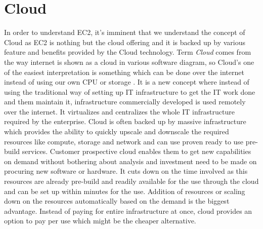 \section{Cloud}
In order to understand EC2, it's imminent that we understand the concept of Cloud as EC2 is nothing but the cloud offering and it is backed up by various feature and benefits provided by the Cloud technology.  Term \emph{Cloud} comes from the way internet is shown as a cloud in various software diagram, so Cloud's one of the easiest interpretation is something which can be done over the internet instead of using our own CPU or storage \cite{www-infoworld}. It is a new concept where instead of using the traditional way of setting up IT infrastructure to get the IT work done and them maintain it, infrastructure commercially developed is used remotely over the internet. It virtualizes and centralizes the whole IT infrastructure required by the enterprise. Cloud is often backed up by massive infrastructure which provides the ability to quickly upscale and downscale the required resources like compute, storage and network and can use proven ready to use pre-build services. Customer prospective cloud enables them to get new capabilities on demand without bothering about analysis and investment need to be made on procuring new software or hardware. It cuts down on the time involved as this resources are already pre-build and readily available for the use through the cloud and can be set up within minutes for the use. Addition of resources or scaling down on the resources automatically based on the demand is the biggest advantage. Instead of paying for entire infrastructure at once, cloud provides an option to pay per use which might be the cheaper alternative.

